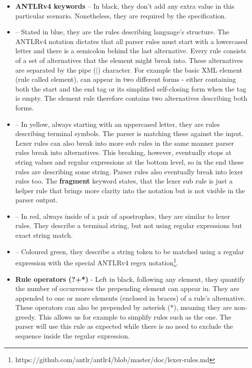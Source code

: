 \begin{itemize}
	\item \textbf{ANTLRv4 keywords} -- In black, they don't add any extra value in this particular scenario. Nonetheless, they are required by the specification.
	
	\item {} -- Stated in blue, they are the rules describing language's structure. The ANTLRv4 notation dictates that all parser rules must start with a lowercased letter and there is a semicolon behind the last alternative. Every rule consists of a set of alternatives that the element might break into. These alternatives are separated by the pipe ($|$) character. For example the basic XML element (rule called element), can appear in two different forms - either containing both the start and the end tag or its simplified self-closing form when the tag is empty. The element rule therefore contains two alternatives describing both forms.
	
	\item {} -- In yellow, always starting with an uppercased letter, they are rules describing terminal symbols. The parser is matching these against the input. Lexer rules can also break into more sub rules in the same manner parser rules break into alternatives. This breaking, however, eventually stops at string values and regular expressions at the bottom level, so in the end these rules are describing some string. Parser rules also eventually break into lexer rules too. The \textbf{fragment} keyword states, that the lexer sub rule is just a helper rule that brings more clarity into the notation but is not visible in the parser output.
	
	\item {} -- In red, always inside of a pair of apostrophes, they are similar to lexer rules. They describe a terminal string, but not using regular expressions but exact string match.
	
	\item {} -- Coloured green, they describe a string token to be matched using a regular expression with the special ANTLRv4 regex notation\footnote{https://github.com/antlr/antlr4/blob/master/doc/lexer-rules.md}.
	
	\item \textbf{Rule operators (?+*)} - Left in black, following any element, they quantify the number of occurrences the prepending element can appear in. They are appended to one or more elements (enclosed in braces) of a rule's alternative. These operators can also be prepended by asterisk (*), meaning they are non-greedy. This allows us for example to simplify rules such as the  one. The parser will use this rule as expected while there is no need to exclude the \literal{\texttt{]]>}} sequence inside the regular expression.
\end{itemize}